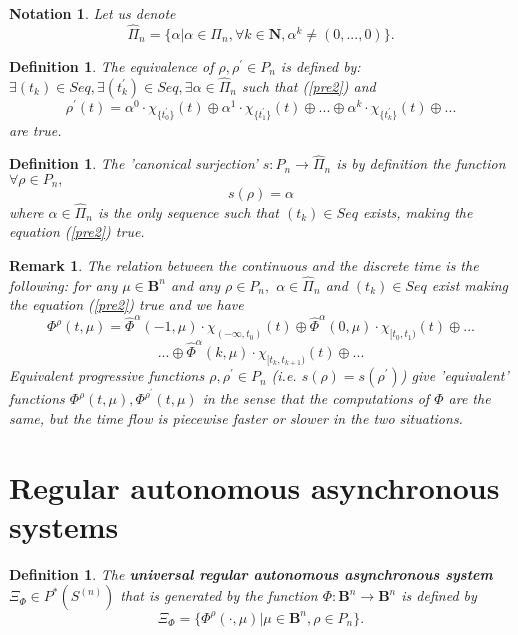 \documentclass[12pt]{article}\usepackage{amsmath}
\newtheorem{definition}[theorem]{Definition}
\newtheorem{notation}[theorem]{Notation}
\newtheorem{remark}[theorem]{Remark}
\begin{document}
\begin{notation}
Let us denote\[
\widehat{\Pi}_{n}=\{\alpha|\alpha\in\Pi_{n},\forall k\in\mathbf{N},\alpha
^{k}\neq(0,...,0)\}.
\]

\end{notation}

\begin{definition}
The equivalence of $\rho,\rho^{\prime}\in P_{n}$ is defined by: $\exists
(t_{k})\in Seq,\exists(t_{k}^{\prime})\in Seq,\exists\alpha\in\widehat{\Pi
}_{n}$ such that (\ref{pre2}) and\[
\rho^{\prime}(t)=\alpha^{0}\cdot\chi_{\{t_{0}^{\prime}\}}(t)\oplus\alpha
^{1}\cdot\chi_{\{t_{1}^{\prime}\}}(t)\oplus...\oplus\alpha^{k}\cdot
\chi_{\{t_{k}^{\prime}\}}(t)\oplus...
\]
are true.
\end{definition}

\begin{definition}
The 'canonical surjection' $s:P_{n}\rightarrow\widehat{\Pi}_{n}$ is by
definition the function $\forall\rho\in P_{n},$\[
s(\rho)=\alpha
\]
where $\alpha\in\widehat{\Pi}_{n}$ is the only sequence such that $(t_{k})\in
Seq$ exists, making the equation (\ref{pre2}) true.
\end{definition}

\begin{remark}
The relation between the continuous and the discrete time is the following:
for any $\mu\in\mathbf{B}^{n}$ and any $\rho\in P_{n},$ $\alpha\in\widehat
{\Pi}_{n}$ and $(t_{k})\in Seq$ exist making the equation (\ref{pre2}) true
and we have\[
\Phi^{\rho}(t,\mu)=\widehat{\Phi}^{\alpha}(-1,\mu)\cdot\chi_{(-\infty,t_{0})}(t)\oplus\widehat{\Phi}^{\alpha}(0,\mu)\cdot\chi_{\lbrack t_{0},t_{1})}(t)\oplus...
\]\[
...\oplus\widehat{\Phi}^{\alpha}(k,\mu)\cdot\chi_{\lbrack t_{k},t_{k+1})}(t)\oplus...
\]
Equivalent progressive functions $\rho,\rho^{\prime}\in P_{n}$ (i.e.
$s(\rho)=s(\rho^{\prime})$) give 'equivalent' functions $\Phi^{\rho}(t,\mu),\Phi^{\rho^{\prime}}(t,\mu)$ in the sense that the computations of
$\Phi$ are the same, but the time flow is piecewise faster or slower in the
two situations.
\end{remark}

\section{Regular autonomous asynchronous systems}

\begin{definition}
The \textbf{universal regular autonomous asynchronous system} $\Xi_{\Phi}\in
P^{\ast}(S^{(n)})$ that is generated by the function $\Phi:\mathbf{B}^{n}\rightarrow\mathbf{B}^{n}$ is defined by
\[
\Xi_{\Phi}=\{\Phi^{\rho}(\cdot,\mu)|\mu\in\mathbf{B}^{n},\rho\in P_{n}\}.
\]

\end{definition}
\end{document}
